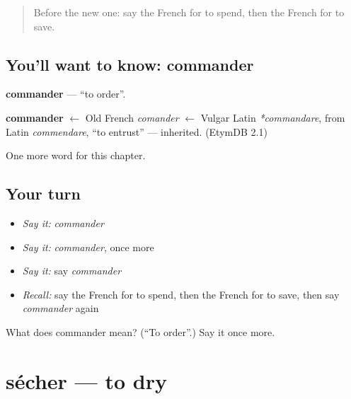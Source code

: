 \label{lesson:FR-C205-commander}



\begin{quote}
Before the new one: say the French for to spend, then the French for to save.
\end{quote}

\subsection*{You'll want to know: commander}
\textbf{commander} — \textquotedblleft{}to order\textquotedblright{}.

\begin{cousinweb}
\textbf{commander} $\leftarrow$ Old French \emph{comander} $\leftarrow$ Vulgar Latin \emph{*commandare}, from Latin \emph{commendare}, \textquotedblleft{}to entrust\textquotedblright{} — inherited. (EtymDB 2.1)
\end{cousinweb}

\begin{grammarlens}[title={What you've built}]
One more word for this chapter.
\end{grammarlens}

\subsection*{Your turn}
\begin{itemize}
\raggedright
  \item \emph{Say it:} \emph{commander}
  \item \emph{Say it:} \emph{commander}, once more
  \item \emph{Say it:} say \emph{commander}
  \item \emph{Recall:} say the French for to spend, then the French for to save, then say \emph{commander} again
\end{itemize}

\begin{tcolorbox}[breakable,colback=teal!4,colframe=teal!35!black,title={Before you move on}]
What does commander mean? (\textquotedblleft{}To order\textquotedblright{}.) Say it once more.
\end{tcolorbox}
\section[sécher]{sécher — to dry}

\label{lesson:FR-C205-secher}



